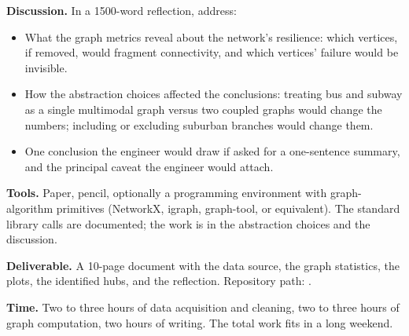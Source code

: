 \begin{project}
\textbf{Discussion.} In a 1500-word reflection, address:
\begin{itemize}[leftmargin=*]
  \item What the graph metrics reveal about the network's
    resilience: which vertices, if removed, would fragment
    connectivity, and which vertices' failure would be invisible.
  \item How the abstraction choices affected the conclusions:
    treating bus and subway as a single multimodal graph versus
    two coupled graphs would change the numbers; including or
    excluding suburban branches would change them.
  \item One conclusion the engineer would draw if asked for a
    one-sentence summary, and the principal caveat the engineer
    would attach.
\end{itemize}

\textbf{Tools.} Paper, pencil, optionally a programming
environment with graph-algorithm primitives (NetworkX, igraph,
graph-tool, or equivalent). The standard library calls are
documented; the work is in the abstraction choices and the
discussion.

\textbf{Deliverable.} A 10-page document with the data source, the
graph statistics, the plots, the identified hubs, and the
reflection. Repository path:
.

\textbf{Time.} Two to three hours of data acquisition and cleaning,
two to three hours of graph computation, two hours of writing.
The total work fits in a long weekend.


\end{project}
